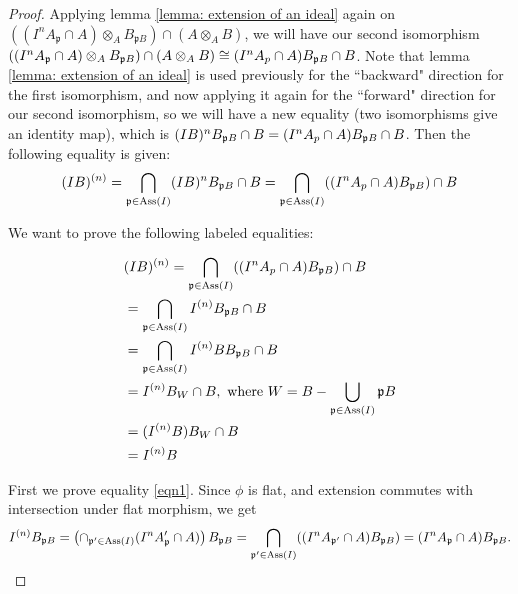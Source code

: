 \documentclass[12pt]{amsart}
\numberwithin{equation}{section}
\theoremstyle{definition}
\DeclareMathOperator{\Ass}{Ass}
\def\pp{{\frak p}}
\begin{document}
\begin{proof}
Applying lemma \ref{lemma: extension of an ideal} again on $(( I^n A_{\mathfrak{p}} \cap A ) \otimes_A B_{\mathfrak{p}B}) \cap (A \otimes_A B)$, we will have our second isomorphism $(( I^n A_{\mathfrak{p}} \cap A ) \otimes_A B_{\mathfrak{p}B}) \cap (A \otimes_A B) \cong (I^n A_p \cap A )B_{\pp B} \cap B$. Note that lemma \ref{lemma: extension of an ideal} is used previously for the ``backward" direction for the first isomorphism, and now applying it again for the ``forward" direction for our second isomorphism, so we will have a new equality (two isomorphisms give an identity map), which is $(IB)^n B_{\mathfrak{p}B} \cap B = (I^n A_p \cap A )B_{\pp B} \cap B$. Then the following equality is given:
\begin{align*}
(IB)^{(n)}  = \bigcap_{\pp\in \Ass(I)} (IB)^nB_{\pp B}\cap B = \bigcap_{\pp \in \Ass(I)} ((I^n A_p \cap A )B_{\pp B}) \cap B
\end{align*}

We want to prove the following labeled equalities:

\begin{align}
&\notag (IB)^{(n)}  = \bigcap_{\pp \in \Ass(I)} ((I^n A_p \cap A )B_{\pp B}) \cap B \\
 \label{eqn1}     &= \bigcap_{\pp \in \Ass(I)} I^{(n)}B_{\pp B} \cap B \\
  \label{eqn2}                & = \bigcap_{\pp \in \Ass(I)} I^{(n)}B B_{\pp B} \cap B \\
 \label{eqn3}     &= I^{(n)}B_W \cap B, \text{ where } W=B - \bigcup_{\pp\in \Ass(I)} \pp B \\
  \label{eqn4}   & =(I^{(n)}B)B_W\cap B \\
 \label{eqn5}       &= I^{(n)}B 
\end{align}

\vspace{5mm}

First we prove equality \ref{eqn1}.  Since $\phi$ is flat, and  extension commutes with intersection under flat morphism, we get 
\begin{align*}
	I^{(n)}B_{\pp B}= \left(\cap_{\pp^\prime\in \Ass(I)} (I^nA_\pp^{\prime}\cap A)\right) B_{\pp B}= \bigcap_{\pp^\prime\in \Ass(I)} ((I^n A_{\pp^\prime}\cap A) B_{\pp B})= (I^nA_\pp \cap A)B_{\pp B}.
\end{align*} 


\end{proof}
\end{document}
